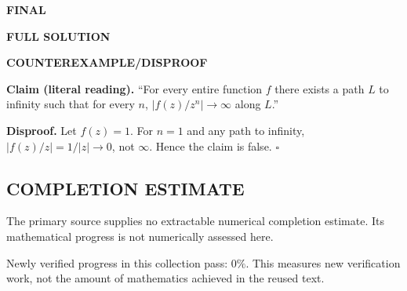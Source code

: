 \medskip
\noindent\textbf{FINAL}

\textbf{FULL SOLUTION}

\textbf{COUNTEREXAMPLE/DISPROOF}

\textbf{Claim (literal reading).} ``For every entire function $f$ there exists a path $L$ to infinity such that for every $n$, $|f(z)/z^n|\to\infty$ along $L$.''

\textbf{Disproof.} Let $f(z)=1$. For $n=1$ and any path to infinity, $|f(z)/z|=1/|z|\to 0$, not $\infty$. Hence the claim is false. \hfill$\square$




\subsection*{COMPLETION ESTIMATE}
The primary source supplies no extractable numerical completion estimate. Its mathematical progress is not numerically assessed here.

Newly verified progress in this collection pass: $0\%$. This measures new verification work, not the amount of mathematics achieved in the reused text.
